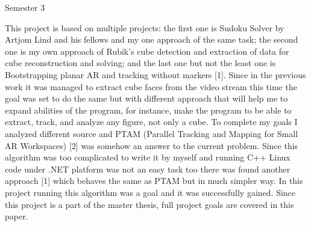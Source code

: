 \documentclass[../main.tex]{subfiles}
\begin{document}
Semester 3

This project is based on multiple projects: the first one is Sudoku Solver by Artjom Lind and his fellows and my one approach of the same task; the second one is my own approach of Rubik’s cube detection and extraction of data for cube reconstruction and solving; and the last one but not the least one is Bootstrapping planar AR and tracking without markers [1]. Since in the previous work it was managed to extract cube faces from the video stream this time the goal was set to do the same but with different approach that will help me to expand abilities of the program, for instance, make the program to be able to extract, track, and analyze any figure, not only a cube. To complete my goals I analyzed different source and PTAM (Parallel Tracking and Mapping for Small AR Workspaces) [2] was somehow an answer to the current problem. Since this algorithm was too complicated to write it by myself and running C++ Linux code under .NET platform was not an easy task too there was found another approach [1] which behaves the same as PTAM but in much simpler way. In this project running this algorithm was a goal and it was successfully gained. Since this project is a part of the master thesis, full project goals are covered in this paper.
\end{document}
